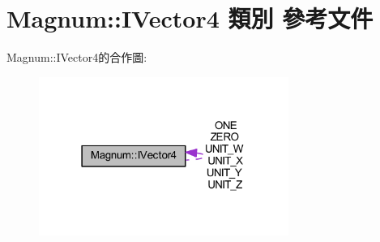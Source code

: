 \hypertarget{class_magnum_1_1_i_vector4}{}\section{Magnum\+:\+:I\+Vector4 類別 參考文件}
\label{class_magnum_1_1_i_vector4}


Magnum\+:\+:I\+Vector4的合作圖\+:\nopagebreak
\begin{figure}[H]
\begin{center}
\leavevmode
\includegraphics[width=231pt]{class_magnum_1_1_i_vector4__coll__graph}
\end{center}
\end{figure}
